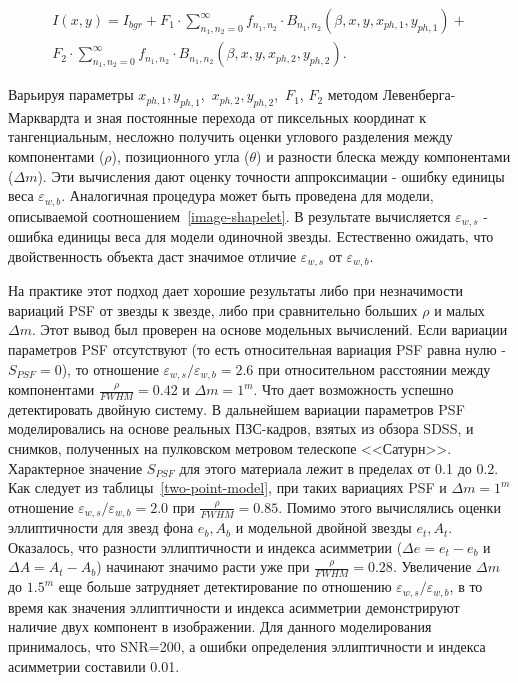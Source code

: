 \begin{align}\label{binary-model}
I(x,y) = I_{bgr}+F_1\cdot\sum_{n_1,n_2=0}^{\infty}f_{n_1,n_2}\cdot B_{n_1,n_2}(\beta,x,y,x_{ph,1},y_{ph,1})+ \nonumber \\
F_2\cdot\sum_{n_1,n_2=0}^{\infty}f_{n_1,n_2}\cdot B_{n_1,n_2}(\beta,x,y,x_{ph,2},y_{ph,2}).
\end{align}

Варьируя параметры $x_{ph,1},y_{ph,1}$,~$x_{ph,2},y_{ph,2}$,~$F_1$, $F_2$ методом Левенберга-Марквардта и зная постоянные перехода от пиксельных координат к тангенциальным, несложно получить оценки углового разделения между компонентами ($\rho$), позиционного угла ($\theta$) и разности блеска между компонентами ($\Delta m$). Эти вычисления дают оценку точности аппроксимации - ошибку единицы веса $\varepsilon_{w,b}$. Аналогичная процедура может быть проведена для модели, описываемой соотношением~\ref{image-shapelet}. В результате вычисляется $\varepsilon_{w,s}$ - ошибка единицы веса для модели одиночной звезды. Естественно ожидать, что двойственность объекта даст значимое отличие $\varepsilon_{w,s}$ от $\varepsilon_{w,b}$.

На практике этот подход дает хорошие результаты либо при незначимости вариаций PSF от звезды к звезде, либо при сравнительно больших $\rho$ и малых $\Delta m$. Этот вывод был проверен на основе модельных вычислений. Если вариации параметров PSF отсутствуют (то есть относительная вариация PSF равна нулю -  $S_{PSF}=0$), то отношение $\varepsilon_{w,s}/\varepsilon_{w,b}=2.6$ при относительном расстоянии между компонентами $\frac{\rho}{FWHM}=0.42$ и $\Delta m = 1^m$. Что дает возможность успешно детектировать двойную систему. В дальнейшем вариации параметров PSF моделировались на основе реальных ПЗС-кадров, взятых из обзора SDSS, и снимков, полученных на пулковском метровом телескопе <<Сатурн>>. Характерное значение $S_{PSF}$ для этого материала лежит в пределах от 0.1 до 0.2. Как следует из таблицы~\ref{two-point-model}, при таких вариациях PSF и $\Delta m = 1^m$ отношение $\varepsilon_{w,s}/\varepsilon_{w,b}=2.0$ при $\frac{\rho}{FWHM}=0.85$. Помимо этого вычислялись оценки эллиптичности для звезд фона $e_{b}, A_{b}$ и модельной двойной звезды $e_{t}, A_{t}$. Оказалось, что  разности эллиптичности и индекса асимметрии ($\Delta e=e_{t} - e_{b}$ и $\Delta A=A_{t} - A_{b}$) начинают значимо расти уже при $\frac{\rho}{FWHM}=0.28$. Увеличение $\Delta m $ до $1.5^m$ еще больше затрудняет детектирование по отношению $\varepsilon_{w,s}/\varepsilon_{w,b}$, в то время как значения эллиптичности и индекса асимметрии  демонстрируют наличие двух компонент в изображении. Для данного моделирования принималось, что SNR=200, а ошибки определения эллиптичности и индекса асимметрии составили 0.01.

